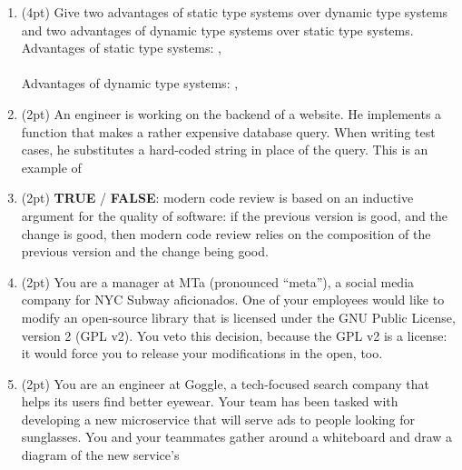 \documentclass{report}
\newif\ifkey
\newcommand{\correct}[1]{\ifkey\color{red}\textbf{#1}\color{black}\else\textbf{#1}\fi\xspace}
\newcommand{\answershort}[1]{\ifkey\color{red}\underline{\textbf{#1}}\color{black}\else\underline{\hspace{3in}}\fi\xspace}
\newcommand*{\pts}[1]{\addtocounter{points}{#1}(#1pt)}
\begin{document}
\begin{spacing}{1.4}
\begin{enumerate}[leftmargin=*]
\item \pts{4} Give two advantages of static type systems over dynamic type systems and two advantages of dynamic type systems over
  static type systems. \\
  Advantages of static type systems: \answershort{early detection of errors},\\ \answershort{types are documentation} \\
  Advantages of dynamic type systems: \answershort{faster prototyping},\\ \answershort{no false positives}

  \item \pts{2} An engineer is working on the backend of a website. He implements a function that makes a rather expensive
    database query. When writing test cases, he substitutes a hard-coded string in place of the query. This is an example of
     \answershort{mocking}

   \item \pts{2} \correct{TRUE} / \textbf{FALSE}: modern code review is based on an inductive argument for the quality of
     software: if the previous version is good, and the change is good, then modern code review relies on the composition
     of the previous version and the change being good.

   \item \pts{2} You are a manager at MTa (pronounced ``meta''), a social media company for NYC Subway aficionados. One of your
     employees would like to modify an open-source library that is licensed under the GNU Public License, version 2 (GPL v2). You veto
     this decision, because the GPL v2 is a \answershort{copyleft} license: it would force you to release your modifications in
     the open, too.

   \item \pts{2} You are an engineer at Goggle, a tech-focused search company that helps its users find better eyewear. Your team
     has been tasked with developing a new microservice that will serve ads to people looking for sunglasses. You and your teammates
     gather around a whiteboard and draw a diagram of the new service's \answershort{architecture}


\end{enumerate}
\end{spacing}
\end{document}
